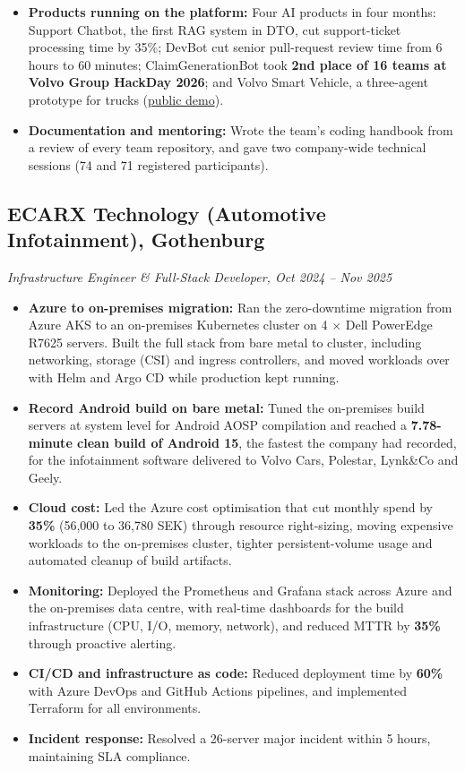 \documentclass[a4paper,10pt]{article}
\begin{document}
\begin{itemize}
  \item \textbf{Products running on the platform:} Four AI products in four months: Support Chatbot, the first RAG system in DTO, cut support-ticket processing time by 35\%; DevBot cut senior pull-request review time from 6 hours to 60 minutes; ClaimGenerationBot took \textbf{2nd place of 16 teams at Volvo Group HackDay 2026}; and Volvo Smart Vehicle, a three-agent prototype for trucks (\href{https://github.com/bluehawana/CoDriver-LLM-TTS-Demo}{public demo}).

  \item \textbf{Documentation and mentoring:} Wrote the team's coding handbook from a review of every team repository, and gave two company-wide technical sessions (74 and 71 registered participants).

\end{itemize}


\subsection*{ECARX Technology (Automotive Infotainment), Gothenburg}
\textit{Infrastructure Engineer \& Full-Stack Developer, Oct 2024 -- Nov 2025}
\begin{itemize}
  \item \textbf{Azure to on-premises migration:} Ran the zero-downtime migration from Azure AKS to an on-premises Kubernetes cluster on 4 $\times$ Dell PowerEdge R7625 servers. Built the full stack from bare metal to cluster, including networking, storage (CSI) and ingress controllers, and moved workloads over with Helm and Argo CD while production kept running.
  \item \textbf{Record Android build on bare metal:} Tuned the on-premises build servers at system level for Android AOSP compilation and reached a \textbf{7.78-minute clean build of Android 15}, the fastest the company had recorded, for the infotainment software delivered to Volvo Cars, Polestar, Lynk\&Co and Geely.
  \item \textbf{Cloud cost:} Led the Azure cost optimisation that cut monthly spend by \textbf{35\%} (56,000 to 36,780 SEK) through resource right-sizing, moving expensive workloads to the on-premises cluster, tighter persistent-volume usage and automated cleanup of build artifacts.
  \item \textbf{Monitoring:} Deployed the Prometheus and Grafana stack across Azure and the on-premises data centre, with real-time dashboards for the build infrastructure (CPU, I/O, memory, network), and reduced MTTR by \textbf{35\%} through proactive alerting.
  \item \textbf{CI/CD and infrastructure as code:} Reduced deployment time by \textbf{60\%} with Azure DevOps and GitHub Actions pipelines, and implemented Terraform for all environments.
  \item \textbf{Incident response:} Resolved a 26-server major incident within 5 hours, maintaining SLA compliance.
\end{itemize}
\end{document}
